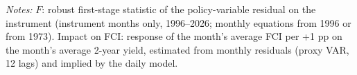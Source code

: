 \begin{table}[tp]\centering\small
\caption{Monthly Proxy VAR: First-Stage Strength and Impact on the FCI}\label{tab:monthlyF}
\begin{flushleft}\footnotesize\textit{Notes:} $F$: robust first-stage statistic of the policy-variable residual on the instrument (instrument months only, 1996--2026; monthly equations from 1996 or from 1973). Impact on FCI: response of the month's average FCI per +1 pp on the month's average 2-year yield, estimated from monthly residuals (proxy VAR, 12 lags) and implied by the daily model.\end{flushleft}
\end{table}
